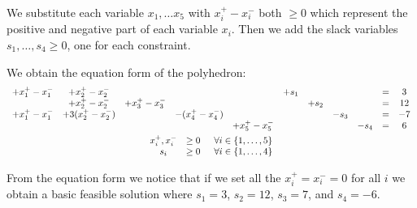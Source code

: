 \documentclass[12pt]{extarticle}
\numberwithin{equation}{section}
\begin{document}
We substitute each variable $x_1, \dots x_5$ with $x_i^+ - x_i^-$ both $\geq 0$ which represent the
positive and negative part of each variable $x_i$.
Then we add the slack variables $s_1, \dots, s_4 \geq 0$, one for each constraint.

We obtain the equation form of the polyhedron:
\begin{gather*}
	\begin{array}{ccccc cccc cc}
		+ x_1^+ - x_1^- & + x_2^+ - x_2^-    &                 &                   &                 & + s_1 &       &       &       & = & 3  \\
		                & + x_2^+ - x_2^-    & + x_3^+ - x_3^- &                   &                 &       & + s_2 &       &       & = & 12 \\
		+ x_1^+ - x_1^- & + 3(x_2^+ - x_2^-) &                 & - (x_4^+ - x_4^-) &                 &       &       & - s_3 &       & = & -7 \\
		                &                    &                 &                   & + x_5^+ - x_5^- &       &       &       & - s_4 & = & 6
	\end{array} \\
	\begin{array}{ccc}
		x_i^+, x_i^- & \geq 0 & \enspace \forall i \in \{1, \dots, 5\} \\
		s_i          & \geq 0 & \enspace \forall i \in \{1, \dots, 4\}
	\end{array}
\end{gather*}

From the equation form we notice that if we set all the $x_i^+ = x_i^- = 0$ for all $i$ we obtain a
basic feasible solution where $s_1 = 3$, $s_2 = 12$, $s_3 = 7$, and $s_4 = -6$.
\end{document}
